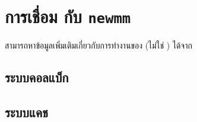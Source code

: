\chapter{การเชื่อม \lualatexlogo กับ \texttt{newmm}}
\label{sec:implementation}

สามารถหาข้อมูลเพิ่มเติมเกี่ยวกับการทำงานของ \luatexlogo (ไม่ใช่
{\ncmfont\LuaLaTeX}) ได้จาก  \parencite{luatex-manual}

\section{ระบบคอลแบ็ก}

\section{ระบบแคช}
